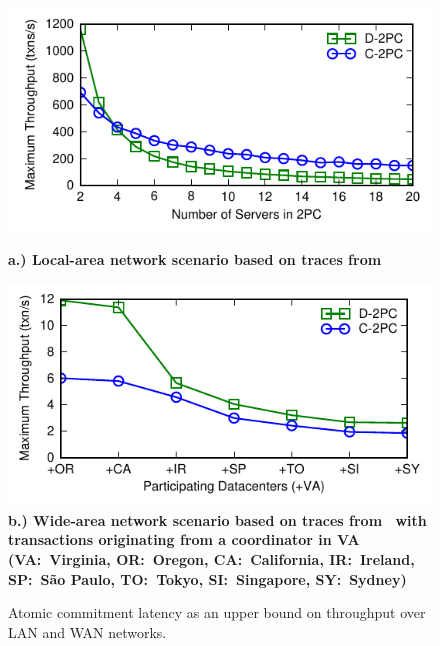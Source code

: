 \begin{figure}
  \includegraphics[width=\columnwidth]{figs/singledc-twopc.pdf}\\ {\centering
    \textbf{\scriptsize a.) Local-area network scenario based on
      traces from~\cite{bobtail}}\par}
  \includegraphics[width=\columnwidth]{figs/multidc-twopc.pdf}\\ \textbf{\scriptsize
    b.) Wide-area network scenario based on traces
    from~\cite{hat-vldb} with transactions originating from a
    coordinator in VA (VA:~Virginia, OR:~Oregon, CA:~California,
    IR:~Ireland, SP:~S\~{a}o Paulo, TO:~Tokyo, SI:~Singapore,
    SY:~Sydney)}

\caption{Atomic commitment latency as an upper bound on throughput
  over LAN and WAN networks.}
\label{fig:2pc}
\end{figure}

